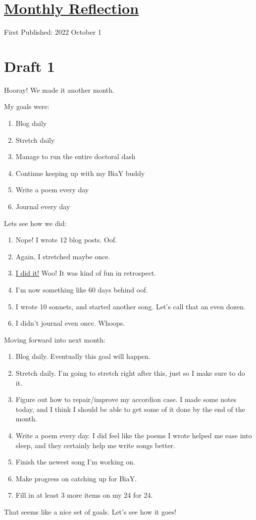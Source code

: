 \documentclass[12pt]{article}[titlepage]
\renewcommand{\,}{\textsuperscript{,}}
\begin{document}
\doublespacing
\section{\href{reflection-september-2022.html}{Monthly Reflection}}
First Published: 2022 October 1

\section{Draft 1}
Hooray! We made it another month.

My goals were:
\begin{enumerate}
\item Blog daily
\item Stretch daily
\item Manage to run the entire doctoral dash
\item Continue keeping up with my BiaY buddy
\item Write a poem every day
\item Journal every day
\end{enumerate}

Lets see how we did:
\begin{enumerate}
\item Nope! I wrote 12 blog posts. Oof.
\item Again, I stretched maybe once.
\item \href{running-1.html}{I did it!} Woo! It was kind of fun in retrospect.
\item I'm now something like 60 days behind oof.
\item I wrote 10 sonnets, and started another song. Let's call that an even dozen.
\item I didn't journal even once. Whoops.
\end{enumerate}

Moving forward into next month:
\begin{enumerate}
\item Blog daily. Eventually this goal will happen.
\item Stretch daily. I'm going to stretch right after this, just so I make sure to do it.
\item Figure out how to repair/improve my accordion case. I made some notes today, and I think I should be able to get some of it done by the end of the month.
\item Write a poem every day. I did feel like the poems I wrote helped me ease into sleep, and they certainly help me write songs better.
\item Finish the newest song I'm working on. 
\item Make progress on catching up for BiaY.
\item Fill in at least 3 more items on my 24 for 24.
\end{enumerate}
That seems like a nice set of goals.
Let's see how it goes!
\end{document}
